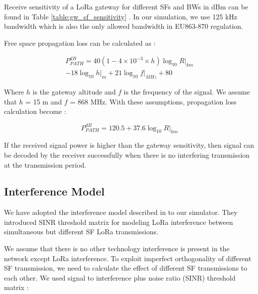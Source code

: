 \documentclass[conference]{IEEEtran}
\begin{document}
\par Receive sensitivity of a LoRa gateway for different SFs and BWs in dBm can be found in Table \ref{table:gw_sf_sensitivity} \cite{SX1276}. In our simulation, we use 125 kHz bandwidth which is also the only allowed bandwidth in EU863-870 regulation.

\par Free space propagation loss can be calculated as \cite{TR136.942}:

\begin{equation} \label{eq:propagation_loss}
\begin{split}
P^{dB}_{PATH} = 40(1 - 4 \times 10^{-3} \times h){\log_{10} R|_{km}} \\
- 18 {\log_{10} h|_{m}} + 21 {\log_{10} f|_{MHz}} + 80
\end{split}
\end{equation}

\par Where $h$ is the gateway altitude and $f$ is the frequency of the signal. We assume that $h$ = 15 m and $f$ = 868 MHz. With these assumptions, propagation loss calculation become \cite{7996384}:

\begin{equation} \label{eq:propagation_loss_simplified}
P^{dB}_{PATH} = 120.5 + 37.6 {\log_{10} R|_{km}}
\end{equation}

\par If the received signal power is higher than the gateway sensitivity, then signal can be decoded by the receiver successfully when there is no interfering transmission at the transmission period.

\subsection{Interference Model}
\par We have adopted the interference model described in \cite{7996384} to our simulator. They introduced SINR threshold matrix for modeling LoRa interference between simultaneous but different SF LoRa transmissions.

\par We assume that there is no other technology interference is present in the network except LoRa interference. To exploit imperfect orthogonality of different SF transmission, we need to calculate the effect of different SF transmissions to each other. We used signal to interference plus noise ratio (SINR) threshold matrix \cite{goursaud:hal-01231221}:
\end{document}
